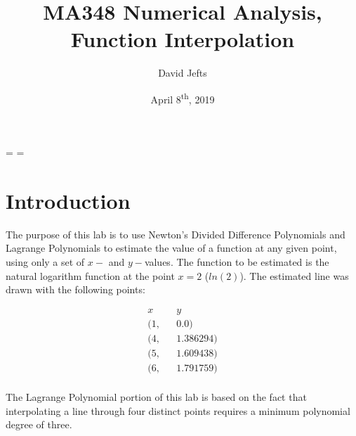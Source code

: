 \documentclass[12pt, letterpaper]{article}
\begin{document}
\setcounter{secnumdepth}{-1}
\binoppenalty=\maxdimen
\relpenalty=\maxdimen

\setlength{\abovedisplayskip}{-0.5\baselineskip}
\setlength{\belowdisplayskip}{0\baselineskip}
\setlength{\abovedisplayshortskip}{0\baselineskip}
\setlength{\belowdisplayshortskip}{0\baselineskip}

\title{MA348 Numerical Analysis, Function Interpolation}
\author{David Jefts}
\date{April 8\textsuperscript{th}, 2019}
\begin{titlepage}
	\centering
	\maketitle
	\centering
	\hfill
	\vfill
	\thispagestyle{empty}
\end{titlepage}

\setlength{\voffset}{-0.5in}
\setlength{\headsep}{10pt}

\section{\label{sec:intro}Introduction}
	The purpose of this lab is to use Newton's Divided Difference Polynomials and Lagrange Polynomials to estimate the value of a function at any given point, using only a set of $x-$ and $y-$values. The function to be estimated is the natural logarithm function at the point $x=2$ ($ln(2)$). The estimated line was drawn with the following points:
		
	\begin{align*}
		x && y \\
		(1, && 0.0) \\
		(4, && 1.386294) \\
		(5, && 1.609438) \\
		(6, && 1.791759) \\
	\end{align*}
	
	The Lagrange Polynomial portion of this lab is based on the fact that interpolating a line through four distinct points requires a minimum polynomial degree of three.
\end{document}
